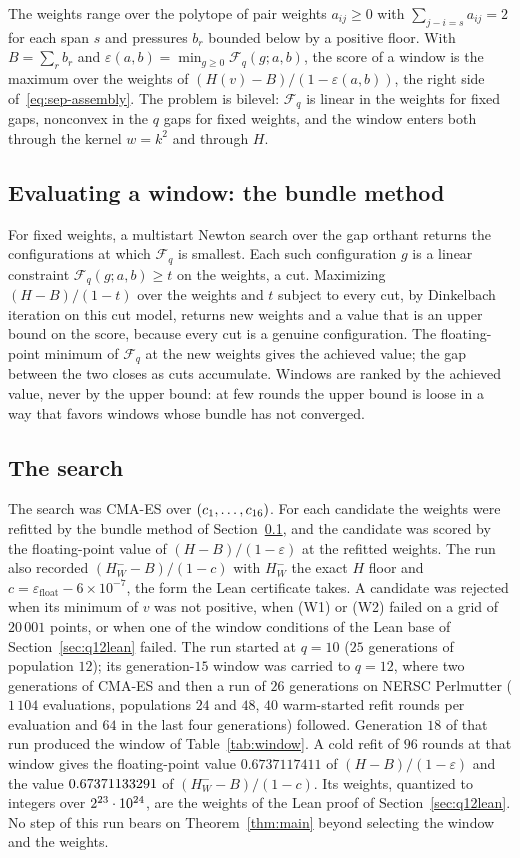 \documentclass[11pt]{article}
\theoremstyle{definition}
\newcommand{\Fr}{\mathcal{F}}
\newcommand{\eps}{\varepsilon}
\begin{document}
The weights range over the polytope of pair weights $a_{ij}\ge0$ with
$\sum_{j-i=s}a_{ij}=2$ for each span $s$ and pressures $b_r$ bounded below by a
positive floor. With $B=\sum_rb_r$ and
$\eps(a,b)=\min_{g\ge0}\Fr_q(g;a,b)$, the score of a window is the maximum over
the weights of $(H(v)-B)/(1-\eps(a,b))$, the right side
of~\eqref{eq:sep-assembly}. The problem is bilevel: $\Fr_q$ is linear in the
weights for fixed gaps, nonconvex in the $q$ gaps for fixed weights, and the
window enters both through the kernel $w=k^2$ and through $H$.

\subsection{Evaluating a window: the bundle method}\label{sec:bundle}
For fixed weights, a multistart Newton search over the gap orthant returns the
configurations at which $\Fr_q$ is smallest. Each such configuration $g$ is a
linear constraint $\Fr_q(g;a,b)\ge t$ on the weights, a cut. Maximizing
$(H-B)/(1-t)$ over the weights and $t$ subject to every cut, by Dinkelbach
iteration on this cut model, returns new weights and a value that is an upper
bound on the score, because every cut is a genuine configuration. The
floating-point minimum of $\Fr_q$ at the new weights gives the achieved value;
the gap between the two closes as cuts accumulate. Windows are ranked by the
achieved value, never by the upper bound: at few rounds the upper bound is loose
in a way that favors windows whose bundle has not converged.

\subsection{The search}\label{app:rec2}
The search was CMA-ES over $(c_1,\dots,c_{16})$. For each candidate the weights were refitted by the bundle method of
Section~\ref{sec:bundle}, and the candidate was scored by the floating-point value
of $(H-B)/(1-\eps)$ at the refitted weights. The run also recorded
$(H_W^--B)/(1-c)$ with $H_W^-$ the exact $H$ floor and
$c=\eps_{\mathrm{float}}-6\times10^{-7}$, the form the Lean certificate takes.
A candidate was rejected when its minimum of $v$ was not positive, when (W1)
or (W2) failed on a grid of $20\,001$ points, or when one of the window
conditions of the Lean base of Section~\ref{sec:q12lean} failed. The run
started at $q=10$ ($25$ generations of population $12$); its generation-$15$
window was carried to $q=12$, where two generations of CMA-ES and then a run of
$26$ generations on NERSC Perlmutter ($1\,104$ evaluations, populations $24$
and $48$, $40$ warm-started refit rounds per evaluation and $64$ in the last
four generations) followed. Generation $18$ of that run produced the window of
Table~\ref{tab:window}. A cold refit of $96$ rounds at that window gives the
floating-point value $0.6737117411$ of $(H-B)/(1-\eps)$ and the value
$0.67371133291$ of $(H_W^--B)/(1-c)$. Its weights, quantized to integers over
$2^{23}\cdot10^{24}$, are the weights of the Lean proof of Section~\ref{sec:q12lean}. No
step of this run bears on Theorem~\ref{thm:main} beyond selecting the window
and the weights.
\end{document}
